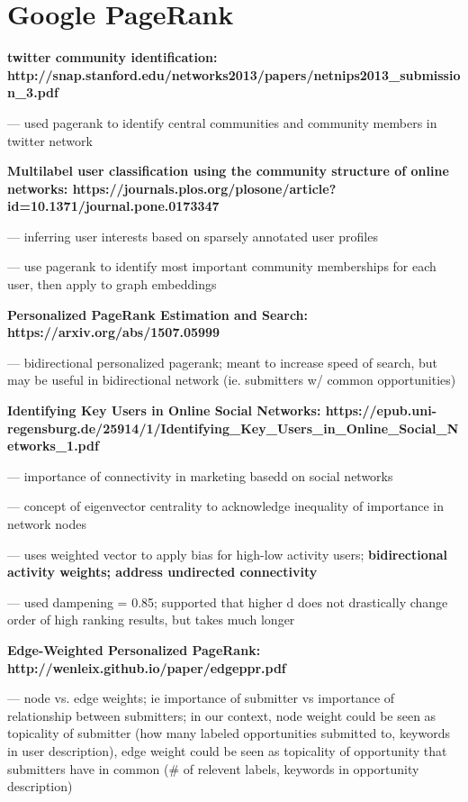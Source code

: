\documentclass[]{report}   %
\begin{document}
\section{Google PageRank}

\textbf{twitter community identification: http://snap.stanford.edu/networks2013/papers/netnips2013\_submission\_3.pdf}

--- used pagerank to identify central communities and community members in twitter network

\textbf{Multilabel user classification using the community structure of online networks: https://journals.plos.org/plosone/article?id=10.1371/journal.pone.0173347}

--- inferring user interests based on sparsely annotated user profiles

--- use pagerank to identify most important community memberships for each user, then apply to graph embeddings

\textbf{Personalized PageRank Estimation and Search: https://arxiv.org/abs/1507.05999}

--- bidirectional personalized pagerank; meant to increase speed of search, but may be useful in bidirectional network (ie. submitters w/ common opportunities)

\textbf{Identifying Key Users in Online Social Networks: https://epub.uni-regensburg.de/25914/1/Identifying\_Key\_Users\_in\_Online\_Social\_Networks\_1.pdf}

--- importance of connectivity in marketing basedd on social networks

--- concept of eigenvector centrality to acknowledge inequality of importance in network nodes

--- uses weighted vector to apply bias for high-low activity users; \textbf{ bidirectional activity weights; address undirected connectivity}

--- used dampening = 0.85; supported that higher d does not drastically change order of high ranking results, but takes much longer

\textbf{Edge-Weighted Personalized PageRank: http://wenleix.github.io/paper/edgeppr.pdf}

--- node vs. edge weights; ie importance of submitter vs importance of relationship between submitters; in our context, node weight could be seen as topicality of submitter (how many labeled opportunities submitted to, keywords in user description), edge weight could be seen as topicality of opportunity that submitters have in common (\# of relevent labels, keywords in opportunity description)
\end{document}

